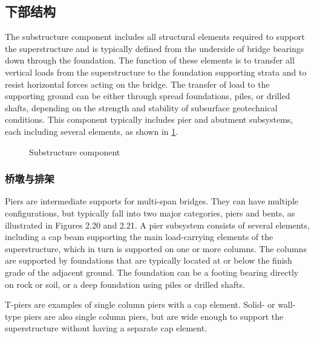 \subsection{下部结构}

The substructure component includes all structural elements required to support the superstructure and is typically defined from the underside of bridge bearings down through the foundation. The function of these elements is to transfer all vertical loads from the superstructure to the foundation supporting strata and to resist horizontal forces acting on the bridge. The transfer of load to the supporting ground can be either through spread foundations, piles, or drilled shafts, depending on the strength and stability of subsurface geotechnical conditions. This component typically includes pier and abutment subsystems, each including several elements, as shown in \cref{fig:substructure-component}.

\begin{figure}
  \caption{Substructure component}
  \label{fig:substructure-component}
\end{figure}

\subsubsection{桥墩与排架}

Piers are intermediate supports for multi-span bridges. They can have multiple configurations, but typically fall into two major categories, piers and bents, as illustrated in Figures 2.20 and 2.21. A pier subsystem consists of several elements, including a cap beam supporting the main load-carrying elements of the superstructure, which in turn is supported on one or more columns. The columns are supported by foundations that are typically located at or below the finish grade of the adjacent ground. The foundation can be a footing bearing directly on rock or soil, or a deep foundation using piles or drilled shafts.

T-piers are examples of single column piers with a cap element. Solid- or wall-type piers are also single column piers, but are wide enough to support the superstructure without having a separate cap element.

